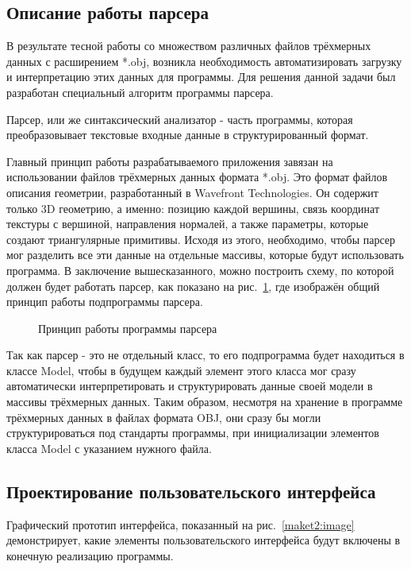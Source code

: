 \subsection{Описание работы парсера}

В результате тесной работы со множеством различных файлов трёхмерных данных с расширением *.obj, возникла необходимость автоматизировать загрузку и интерпретацию этих данных для программы. Для решения данной задачи был разработан специальный алгоритм программы парсера.

Парсер, или же синтаксический анализатор - часть программы, которая преобразовывает текстовые входные данные в структурированный формат.

Главный принцип работы разрабатываемого приложения завязан на использовании файлов трёхмерных данных формата *.obj. Это формат файлов описания геометрии, разработанный в Wavefront Technologies. Он содержит только 3D геометрию, а именно: позицию каждой вершины, связь координат текстуры с вершиной, направления нормалей, а также параметры, которые создают триангулярные примитивы. Исходя из этого, необходимо, чтобы парсер мог разделить все эти данные на отдельные массивы, которые будут использовать программа. В заключение вышесказанного, можно построить схему, по которой должен будет работать парсер, как показано на рис.~\ref{diagram4:image}, где изображён общий принцип работы подпрограммы парсера.

\begin{figure}[ht]
	\caption{Принцип работы программы парсера}
	\label{diagram4:image}
\end{figure}

Так как парсер - это не отдельный класс, то его подпрограмма будет находиться в классе Model, чтобы в будущем каждый элемент этого класса мог сразу автоматически интерпретировать и структурировать данные своей модели в массивы трёхмерных данных. Таким образом, несмотря на хранение в программе трёхмерных данных в файлах формата OBJ, они сразу бы могли структурироваться под стандарты программы, при инициализации элементов класса Model с указанием нужного файла.


\subsection{Проектирование пользовательского интерфейса}

Графический прототип интерфейса, показанный на рис.~\ref{maket2:image} демонстрирует, какие элементы пользовательского интерфейса будут включены в конечную реализацию программы.


